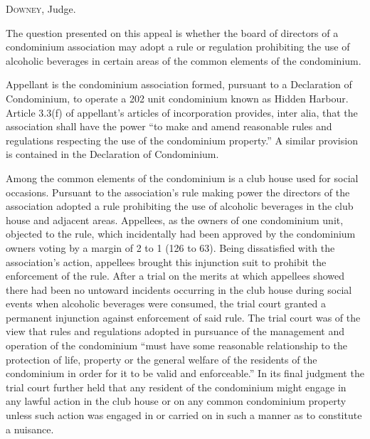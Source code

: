 

\opinion \textsc{Downey}, Judge.

The question presented on this appeal is whether the board of directors of a
condominium association may adopt a rule or regulation prohibiting the use of
alcoholic beverages in certain areas of the common elements of the condominium.

Appellant is the condominium association formed, pursuant to a Declaration of
Condominium, to operate a 202 unit condominium known as Hidden Harbour. Article
3.3(f) of appellant's articles of incorporation provides, inter alia, that the
association shall have the power ``to make and amend reasonable rules and
regulations respecting the use of the condominium property.'' A similar
provision is contained in the Declaration of Condominium.

Among the common elements of the condominium is a club house used for social
occasions. Pursuant to the association's rule making power the directors of the
association adopted a rule prohibiting the use of alcoholic beverages in the
club house and adjacent areas. Appellees, as the owners of one condominium unit,
objected to the rule, which incidentally had been approved by the condominium
owners voting by a margin of 2 to 1 (126 to 63). Being dissatisfied with the
association's action, appellees brought this injunction suit to prohibit the
enforcement of the rule. After a trial on the merits at which appellees showed
there had been no untoward incidents occurring in the club house during social
events when alcoholic beverages were consumed, the trial court granted a
permanent injunction against enforcement of said rule. The trial court was of
the view that rules and regulations adopted in pursuance of the management and
operation of the condominium ``must have some reasonable relationship to the
protection of life, property or the general welfare of the residents of the
condominium in order for it to be valid and enforceable.'' In its final judgment
the trial court further held that any resident of the condominium might engage
in any lawful action in the club house or on any common condominium property
unless such action was engaged in or carried on in such a manner as to
constitute a nuisance.

